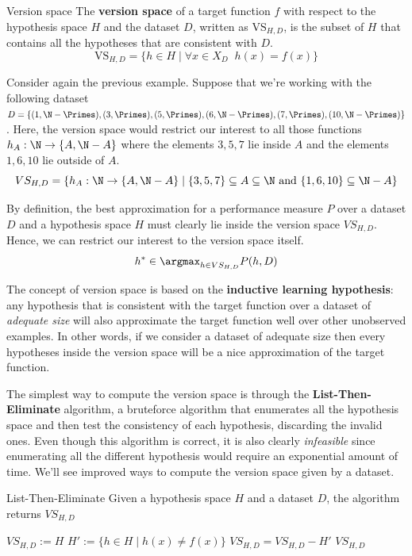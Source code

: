 \documentclass[a4paper, 12pt]{report}
\begin{document}
    \begin{frameddefn}{Version space}
        The \textbf{version space} of a target function $f$ with respect to the hypothesis space $H$ and the dataset $D$, written as $\mathrm{VS}_{H,D}$, is the subset of $H$ that contains all the hypotheses that are consistent with $D$.
        \[\mathrm{VS}_{H,D} = \{h \in H \mid \forall x \in X_D \;\; h(x) = f(x)\}\] 
    \end{frameddefn}

    Consider again the previous example. Suppose that we're working with the following dataset $D = \{(1, \N-\Primes), (3, \Primes), (5, \Primes), (6, \N-\Primes), (7, \Primes), (10, \N-\Primes) \}$. Here, the version space would restrict our interest to all those functions $h_A : \N \to \{A, \N-A\}$ where the elements $3,5,7$ lie inside $A$ and the elements $1,6,10$ lie outside of $A$.
    \[VS_{H,D} = \{h_A : \N \to \{A, \N-A\} \mid \{3,5,7\} \subseteq A \subseteq \N \text{ and } \{1,6,10\} \subseteq \N-A\}\]

    By definition, the best approximation for a performance measure $P$ over a dataset $D$ and a hypothesis space $H$ must clearly lie inside the version space $VS_{H,D}$. Hence, we can restrict our interest to the version space itself.
    \[h^* \in \argmax_{h \in VS_{H,D}} P(h,D)\]

    The concept of version space is based on the \textbf{inductive learning hypothesis}: any hypothesis that is consistent with the target function over a dataset of \textit{adequate size} will also approximate the target function well over other unobserved examples. In other words, if we consider a dataset of adequate size then every hypotheses inside the version space will be a nice approximation of the target function. 
    
    The simplest way to compute the version space is through the \textbf{List-Then-Eliminate} algorithm, a bruteforce algorithm that enumerates all the hypothesis space and then test the consistency of each hypothesis, discarding the invalid ones. Even though this algorithm is correct, it is also clearly \textit{infeasible} since enumerating all the different hypothesis would require an exponential amount of time. We'll see improved ways to compute the version space given by a dataset.

    \begin{framedalgo}[label={lte}]{List-Then-Eliminate}
        Given a hypothesis space $H$ and a dataset $D$, the algorithm returns $VS_{H, D}$
        \begin{algorithmic}
                \State $VS_{H, D} := H$
                    \State $H' := \{h \in H \mid h(x) \neq f(x)\}$
                    \State $VS_{H, D} = VS_{H, D} - H'$
                \EndFor
                \State {} $VS_{H,D}$
            \EndFunction
        \end{algorithmic}
    \end{framedalgo}
\end{document}
